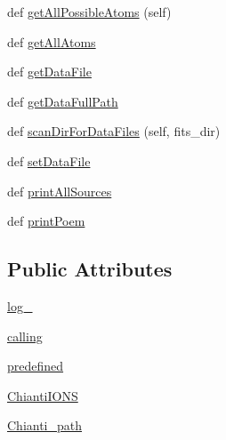 \begin{DoxyCompactItemize}
\item 
def \hyperlink{classpyneb_1_1utils_1_1manage__atomic__data_1_1___manage_atomic_data_a5de7925aac194c157f7fbd243ee25c17}{get\+All\+Possible\+Atoms} (self)
\item 
def \hyperlink{classpyneb_1_1utils_1_1manage__atomic__data_1_1___manage_atomic_data_a6e4f6d5890cfb5e3371b46c319c67f53}{get\+All\+Atoms}
\item 
def \hyperlink{classpyneb_1_1utils_1_1manage__atomic__data_1_1___manage_atomic_data_a289b3ad01e359e3550b2384362c36990}{get\+Data\+File}
\item 
def \hyperlink{classpyneb_1_1utils_1_1manage__atomic__data_1_1___manage_atomic_data_ac8f4b782b3aee9491aa3542fd933bd52}{get\+Data\+Full\+Path}
\item 
def \hyperlink{classpyneb_1_1utils_1_1manage__atomic__data_1_1___manage_atomic_data_af9b8c445d7b585983c8b5221aad5402f}{scan\+Dir\+For\+Data\+Files} (self, fits\+\_\+dir)
\item 
def \hyperlink{classpyneb_1_1utils_1_1manage__atomic__data_1_1___manage_atomic_data_a76ee45cb9b8a5ead8cd716ebc0facf92}{set\+Data\+File}
\item 
def \hyperlink{classpyneb_1_1utils_1_1manage__atomic__data_1_1___manage_atomic_data_a17f7d0a39484aa363bd2814ffbee2855}{print\+All\+Sources}
\item 
def \hyperlink{classpyneb_1_1utils_1_1manage__atomic__data_1_1___manage_atomic_data_a780a8f85e8acf64b44b2bce4b4292386}{print\+Poem}
\end{DoxyCompactItemize}
\subsection*{Public Attributes}
\begin{DoxyCompactItemize}
\item 
\hyperlink{classpyneb_1_1utils_1_1manage__atomic__data_1_1___manage_atomic_data_a1d8277ab92e8bac3e52ade094ba63773}{log\+\_\+}
\item 
\hyperlink{classpyneb_1_1utils_1_1manage__atomic__data_1_1___manage_atomic_data_ab10b91ca784741ce7af163d010802434}{calling}
\item 
\hyperlink{classpyneb_1_1utils_1_1manage__atomic__data_1_1___manage_atomic_data_a42d17444c105bd5238ae202a722ecb47}{predefined}
\item 
\hyperlink{classpyneb_1_1utils_1_1manage__atomic__data_1_1___manage_atomic_data_a06491f5f808df3d4e58b35e09db74a18}{Chianti\+I\+O\+N\+S}
\item 
\hyperlink{classpyneb_1_1utils_1_1manage__atomic__data_1_1___manage_atomic_data_a898e51085e3461333ea9df3a3fce3599}{Chianti\+\_\+path}
\end{DoxyCompactItemize}
